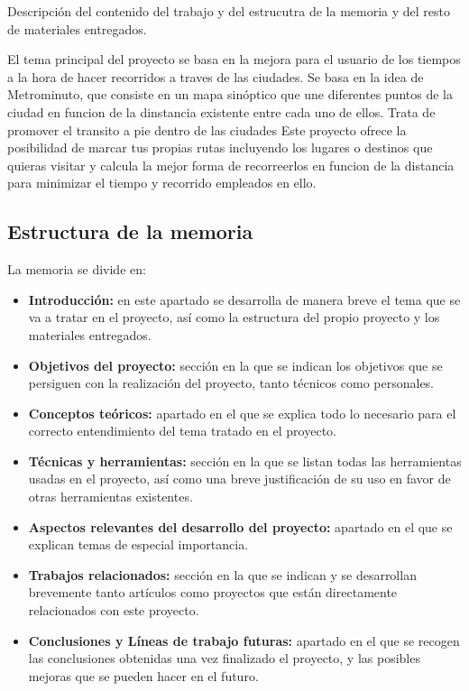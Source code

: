 Descripción del contenido del trabajo y del estrucutra de la memoria y del resto de materiales entregados.

El tema principal del proyecto se basa en la mejora para el usuario de los tiempos a la hora de hacer recorridos a traves de las  ciudades. Se basa en la idea de Metrominuto, que consiste en un mapa sinóptico que une diferentes puntos de la ciudad en funcion de la dinstancia existente entre cada uno de ellos. Trata de promover el transito a pie dentro de las ciudades
Este proyecto ofrece la posibilidad de marcar tus propias rutas incluyendo los lugares o destinos que quieras visitar y calcula la mejor forma de recorreerlos en funcion de la distancia para minimizar el tiempo y recorrido empleados en ello.

\subsection{Estructura de la memoria}\label{estructura-memoria}
La memoria se divide en:
\begin{itemize}
\tightlist
\item \textbf{Introducción:} en este apartado se desarrolla de manera breve el tema que se va a tratar en el proyecto, así como la estructura del propio proyecto y los materiales entregados.
\item \textbf{Objetivos del proyecto:} sección en la que se indican los objetivos que se persiguen con la realización del proyecto, tanto técnicos como personales.
\item \textbf{Conceptos teóricos:} apartado en el que se explica todo lo necesario para el correcto entendimiento del tema tratado en el proyecto.
\item \textbf{Técnicas y herramientas:} sección en la que se listan todas las herramientas usadas en el proyecto, así como una breve justificación de su uso en favor de otras herramientas existentes.
\item \textbf{Aspectos relevantes del desarrollo del proyecto:} apartado en el que se explican temas de especial importancia.
\item \textbf{Trabajos relacionados:} sección en la que se indican y se desarrollan brevemente tanto artículos como proyectos que están directamente relacionados con este proyecto.
\item \textbf{Conclusiones y Líneas de trabajo futuras:} apartado en el que se recogen las conclusiones obtenidas una vez finalizado el proyecto, y las posibles mejoras que se pueden hacer en el futuro.
\end{itemize}